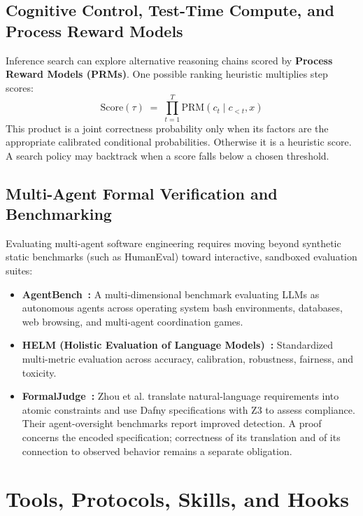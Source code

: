 \subsection{Cognitive Control, Test-Time Compute, and Process Reward Models}

Inference search can explore alternative reasoning chains scored by \textbf{Process Reward Models (PRMs)}. One possible ranking heuristic multiplies step scores:
\begin{equation}
\mathrm{Score}(\tau) \;=\; \prod_{t=1}^T \mathrm{PRM}(c_t \mid c_{<t}, x)
\end{equation}
This product is a joint correctness probability only when its factors are the appropriate calibrated conditional probabilities. Otherwise it is a heuristic score. A search policy may backtrack when a score falls below a chosen threshold.

\subsection{Multi-Agent Formal Verification and Benchmarking}

Evaluating multi-agent software engineering requires moving beyond synthetic static benchmarks (such as HumanEval) toward interactive, sandboxed evaluation suites:
\begin{itemize}[leftmargin=1.8em,itemsep=2pt]
  \item \textbf{AgentBench~:} A multi-dimensional benchmark evaluating LLMs as autonomous agents across operating system bash environments, databases, web browsing, and multi-agent coordination games.
  \item \textbf{HELM (Holistic Evaluation of Language Models)~:} Standardized multi-metric evaluation across accuracy, calibration, robustness, fairness, and toxicity.
  \item \textbf{FormalJudge~:} Zhou et al. translate natural-language requirements into atomic constraints and use Dafny specifications with Z3 to assess compliance. Their agent-oversight benchmarks report improved detection. A proof concerns the encoded specification; correctness of its translation and of its connection to observed behavior remains a separate obligation.
\end{itemize}

\section{Tools, Protocols, Skills, and Hooks}\label{sec:prereq-hypervisors}

